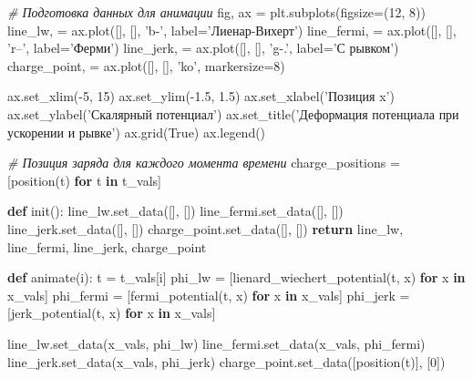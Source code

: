 \documentclass[11pt]{article}
\newenvironment{Shaded}{}{}
\newcommand{\KeywordTok}[1]{\textcolor[rgb]{0.00,0.44,0.13}{\textbf{{#1}}}}
\newcommand{\DecValTok}[1]{\textcolor[rgb]{0.25,0.63,0.44}{{#1}}}
\newcommand{\FloatTok}[1]{\textcolor[rgb]{0.25,0.63,0.44}{{#1}}}
\newcommand{\StringTok}[1]{\textcolor[rgb]{0.25,0.44,0.63}{{#1}}}
\newcommand{\CommentTok}[1]{\textcolor[rgb]{0.38,0.63,0.69}{\textit{{#1}}}}
\newcommand{\NormalTok}[1]{{#1}}
\newcommand{\VariableTok}[1]{\textcolor[rgb]{0.10,0.09,0.49}{{#1}}}
\newcommand{\ControlFlowTok}[1]{\textcolor[rgb]{0.00,0.44,0.13}{\textbf{{#1}}}}
\newcommand{\OperatorTok}[1]{\textcolor[rgb]{0.40,0.40,0.40}{{#1}}}
\begin{document}
\begin{Shaded}
\begin{Highlighting}[]
\CommentTok{# Подготовка данных для анимации}
\NormalTok{fig, ax }\OperatorTok{=}\NormalTok{ plt.subplots(figsize}\OperatorTok{=}\NormalTok{(}\DecValTok{12}\NormalTok{, }\DecValTok{8}\NormalTok{))}
\NormalTok{line_lw, }\OperatorTok{=}\NormalTok{ ax.plot([], [], }\StringTok{'b-'}\NormalTok{, label}\OperatorTok{=}\StringTok{'Лиенар-Вихерт'}\NormalTok{)}
\NormalTok{line_fermi, }\OperatorTok{=}\NormalTok{ ax.plot([], [], }\StringTok{'r--'}\NormalTok{, label}\OperatorTok{=}\StringTok{'Ферми'}\NormalTok{)}
\NormalTok{line_jerk, }\OperatorTok{=}\NormalTok{ ax.plot([], [], }\StringTok{'g-.'}\NormalTok{, label}\OperatorTok{=}\StringTok{'С рывком'}\NormalTok{)}
\NormalTok{charge_point, }\OperatorTok{=}\NormalTok{ ax.plot([], [], }\StringTok{'ko'}\NormalTok{, markersize}\OperatorTok{=}\DecValTok{8}\NormalTok{)}

\NormalTok{ax.set_xlim(}\OperatorTok{-}\DecValTok{5}\NormalTok{, }\DecValTok{15}\NormalTok{)}
\NormalTok{ax.set_ylim(}\OperatorTok{-}\FloatTok{1.5}\NormalTok{, }\FloatTok{1.5}\NormalTok{)}
\NormalTok{ax.set_xlabel(}\StringTok{'Позиция x'}\NormalTok{)}
\NormalTok{ax.set_ylabel(}\StringTok{'Скалярный потенциал'}\NormalTok{)}
\NormalTok{ax.set_title(}\StringTok{'Деформация потенциала при ускорении и рывке'}\NormalTok{)}
\NormalTok{ax.grid(}\VariableTok{True}\NormalTok{)}
\NormalTok{ax.legend()}

\CommentTok{# Позиция заряда для каждого момента времени}
\NormalTok{charge_positions }\OperatorTok{=}\NormalTok{ [position(t) }\ControlFlowTok{for}\NormalTok{ t }\KeywordTok{in}\NormalTok{ t_vals]}

\KeywordTok{def}\NormalTok{ init():}
\NormalTok{    line_lw.set_data([], [])}
\NormalTok{    line_fermi.set_data([], [])}
\NormalTok{    line_jerk.set_data([], [])}
\NormalTok{    charge_point.set_data([], [])}
    \ControlFlowTok{return}\NormalTok{ line_lw, line_fermi, line_jerk, charge_point}

\KeywordTok{def}\NormalTok{ animate(i):}
\NormalTok{    t }\OperatorTok{=}\NormalTok{ t_vals[i]}
\NormalTok{    phi_lw }\OperatorTok{=}\NormalTok{ [lienard_wiechert_potential(t, x) }\ControlFlowTok{for}\NormalTok{ x }\KeywordTok{in}\NormalTok{ x_vals]}
\NormalTok{    phi_fermi }\OperatorTok{=}\NormalTok{ [fermi_potential(t, x) }\ControlFlowTok{for}\NormalTok{ x }\KeywordTok{in}\NormalTok{ x_vals]}
\NormalTok{    phi_jerk }\OperatorTok{=}\NormalTok{ [jerk_potential(t, x) }\ControlFlowTok{for}\NormalTok{ x }\KeywordTok{in}\NormalTok{ x_vals]}

\NormalTok{    line_lw.set_data(x_vals, phi_lw)}
\NormalTok{    line_fermi.set_data(x_vals, phi_fermi)}
\NormalTok{    line_jerk.set_data(x_vals, phi_jerk)}
\NormalTok{    charge_point.set_data([position(t)], [}\DecValTok{0}\NormalTok{])}


\end{Highlighting}
\end{Shaded}
\end{document}
